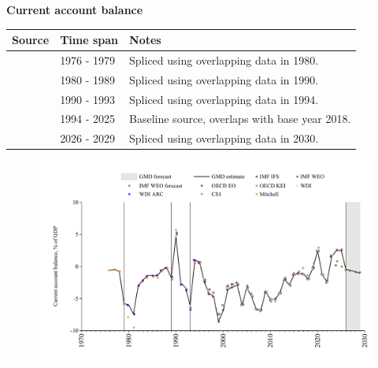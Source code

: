 \documentclass[12pt,a4paper,landscape]{article}
\begin{document}
\begin{adjustbox}{max totalsize={\paperwidth}{\paperheight},center}
\begin{minipage}[t][\textheight][t]{\textwidth}
\vspace*{0.5cm}
{}
\begin{center}
{\Large\bfseries Current account balance}
\end{center}
\vspace{0.5cm}
\begin{table}[H]
\centering
\small
\begin{tabular}{|l|l|l|}
\hline
\textbf{Source} & \textbf{Time span} & \textbf{Notes} \\
\hline
\rowcolor{white}\cite{Mitchell}& 1976 - 1979 &Spliced using overlapping data in 1980. \\
\rowcolor{lightgray}\cite{WDI_ARC}& 1980 - 1989 &Spliced using overlapping data in 1990. \\
\rowcolor{white}\cite{WDI}& 1990 - 1993 &Spliced using overlapping data in 1994. \\
\rowcolor{lightgray}\cite{OECD_EO}& 1994 - 2025 &Baseline source, overlaps with base year 2018. \\
\rowcolor{white}\cite{IMF_WEO_forecast}& 2026 - 2029 &Spliced using overlapping data in 2030. \\
\hline
\end{tabular}
\end{table}
\begin{figure}[H]
\centering
\includegraphics[width=\textwidth,height=0.6\textheight,keepaspectratio]{graphs/POL_CA_GDP.pdf}
\end{figure}
\end{minipage}
\end{adjustbox}
\end{document}
